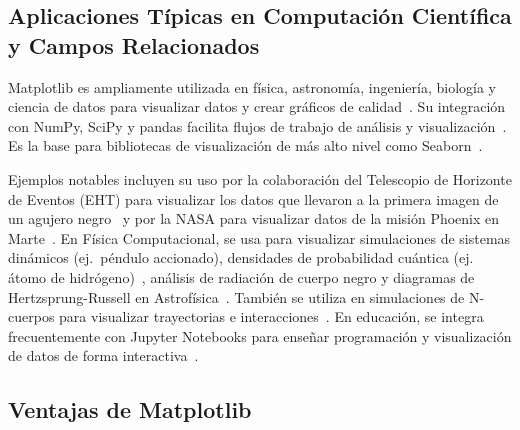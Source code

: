 \subsection{Aplicaciones Típicas en Computación Científica y Campos Relacionados}%
\label{subsec:aplicaciones}

Matplotlib es ampliamente utilizada en física, astronomía, ingeniería, biología y ciencia de datos para visualizar datos y crear gráficos de calidad~\cite{VanderPlas2016}. Su integración con NumPy, SciPy y pandas facilita flujos de trabajo de análisis y visualización~\cite{VanderPlas2016, SciPyLecturesEcosystem}. Es la base para bibliotecas de visualización de más alto nivel como Seaborn~\cite{Waskom2021}.

Ejemplos notables incluyen su uso por la colaboración del Telescopio de Horizonte de Eventos (EHT) para visualizar los datos que llevaron a la primera imagen de un agujero negro~\cite{EHT2019} y por la NASA para visualizar datos de la misión Phoenix en Marte~\cite{delftswaMatplotlib}. En Física Computacional, se usa para visualizar simulaciones de sistemas dinámicos (ej.\ péndulo accionado), densidades de probabilidad cuántica (ej. átomo de hidrógeno)~\cite{Landau2015}, análisis de radiación de cuerpo negro y diagramas de Hertzsprung-Russell en Astrofísica~\cite{RealPythonAstro}. También se utiliza en simulaciones de N-cuerpos para visualizar trayectorias e interacciones~\cite{GitHubARPMayNBody}. En educación, se integra frecuentemente con Jupyter Notebooks para enseñar programación y visualización de datos de forma interactiva~\cite{VanderPlas2016}.

\subsection{Ventajas de Matplotlib}%
\label{subsec:ventajas}

